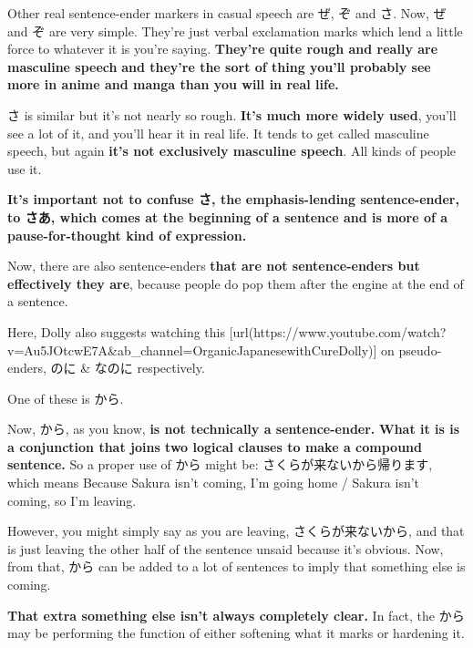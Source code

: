 \startsectionlevel[title={ぜ、ぞ、さ},reference={ぜぞさ}]

Other real sentence-ender markers in casual speech are ぜ, ぞ and さ. Now, ぜ and ぞ are very simple. They're just verbal exclamation marks which lend a little force to whatever it is you're saying. {\bf They're quite rough and really are masculine speech} {\bf and they're the sort of thing you'll probably see} {\bf more in anime and manga than you will in real life.}

{}

さ is similar but it's not nearly so rough. {\bf It's much more widely used}, you'll see a lot of it, and you'll hear it in real life. It tends to get called masculine speech, but again {\bf it's not exclusively masculine speech}. All kinds of people use it.

{\bf It's important not to confuse さ, the emphasis-lending sentence-ender,} {\bf to さあ, which comes at the beginning of a sentence and is more of a pause-for-thought kind of expression.}

\thinrule

Now, there are also sentence-enders {\bf that are not sentence-enders but effectively they are}, because people do pop them after the engine at the end of a sentence.

{}\crlf
Here, Dolly also suggests watching this [url(https://www.youtube.com/watch?v=Au5JOtcwE7A&ab_channel=OrganicJapanesewithCureDolly)] on pseudo-enders, のに & なのに respectively.

One of these is から.

\stopsectionlevel

\startsectionlevel[title={から sentence-ender},reference={から-sentence-ender}]

Now, から, as you know, {\bf is not technically a sentence-ender.} {\bf What it is is a conjunction that joins two logical clauses to make a compound sentence.} So a proper use of から might be: さくらが来ないから帰ります, which means\crlf
Because Sakura isn't coming, I'm going home / Sakura isn't coming, so I'm leaving.

However, you might simply say as you are leaving, さくらが来ないから,\crlf
and that is just leaving the other half of the sentence unsaid because it's obvious. Now, from that, から can be added to a lot of sentences to imply that something else is coming.

{\bf That extra something else isn't always completely clear.} In fact, the から may be performing the function of either softening what it marks or hardening it.

